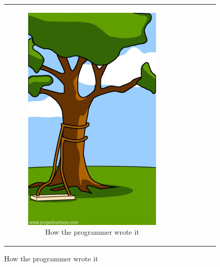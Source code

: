 \begin{figure}[h]
\begin{center}
\begin{tabular}{|c|c|c|c|c|c|}
\begin{subfigure}[t]{0.15\textwidth}\centering\includegraphics[width=0.9\columnwidth]{images/howprogrammed}
\caption*{\tiny \centering How the programmer wrote it}\label{fig:howprogrammed}\end{subfigure}&

\end{tabular}
\end{center}
\end{figure}
